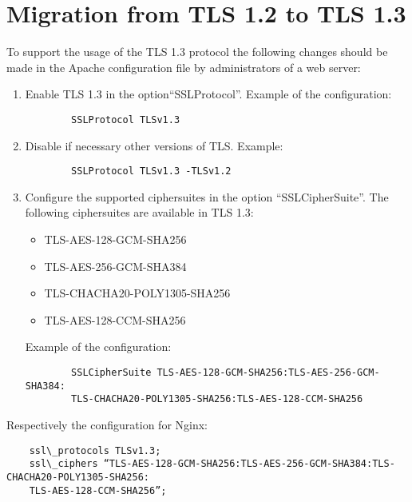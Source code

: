 \chapter{Migration from TLS 1.2 to TLS 1.3}
\label{chap:migration}

To support the usage of the TLS 1.3 protocol the following changes should be made in the Apache configuration file by administrators of a web server:\\
\begin{enumerate}
	\item Enable TLS 1.3 in the option“SSLProtocol”. Example of the configuration:
    \begin{verbatim}
        SSLProtocol TLSv1.3
    \end{verbatim}
    \item Disable if necessary other versions of TLS. Example: 
    \begin{verbatim}
        SSLProtocol TLSv1.3 -TLSv1.2
    \end{verbatim}
    \item Configure the supported ciphersuites in the option “SSLCipherSuite”. The following ciphersuites are available in TLS 1.3:
    \begin{itemize}
        \item TLS-AES-128-GCM-SHA256
        \item TLS-AES-256-GCM-SHA384
        \item TLS-CHACHA20-POLY1305-SHA256
        \item TLS-AES-128-CCM-SHA256
    \end{itemize}
    Example of the configuration:
    \begin{verbatim}
        SSLCipherSuite TLS-AES-128-GCM-SHA256:TLS-AES-256-GCM-SHA384:
        TLS-CHACHA20-POLY1305-SHA256:TLS-AES-128-CCM-SHA256
    \end{verbatim}
\end{enumerate}

Respectively the configuration for Nginx:
\begin{verbatim}
    ssl\_protocols TLSv1.3;
    ssl\_ciphers “TLS-AES-128-GCM-SHA256:TLS-AES-256-GCM-SHA384:TLS-CHACHA20-POLY1305-SHA256:
    TLS-AES-128-CCM-SHA256”;
\end{verbatim}
